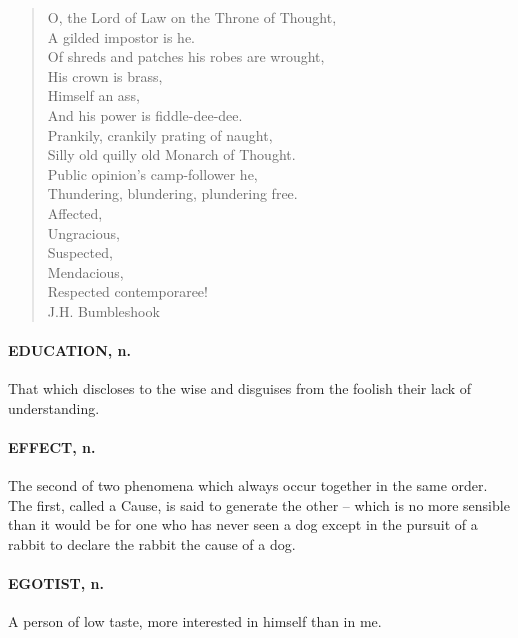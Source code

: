 \documentclass[11pt]{article}
\begin{document}
\begin{quote} O, the Lord of Law on the Throne of Thought, \\
       A gilded impostor is he. \\
  Of shreds and patches his robes are wrought, \\
              His crown is brass, \\
              Himself an ass, \\
      And his power is fiddle-dee-dee. \\
  Prankily, crankily prating of naught, \\
  Silly old quilly old Monarch of Thought. \\
      Public opinion's camp-follower he, \\
      Thundering, blundering, plundering free. \\
                  Affected, \\
                      Ungracious, \\
                  Suspected, \\
                      Mendacious, \\
  Respected contemporaree! \\
                                                    J.H. Bumbleshook  \end{quote}

\paragraph{EDUCATION, n.} That which discloses to the wise and disguises from the
foolish their lack of understanding.

\paragraph{EFFECT, n.}  The second of two phenomena which always occur together in
the same order.  The first, called a Cause, is said to generate the
other -- which is no more sensible than it would be for one who has
never seen a dog except in the pursuit of a rabbit to declare the
rabbit the cause of a dog.

\paragraph{EGOTIST, n.}  A person of low taste, more interested in himself than in me.
\end{document}
